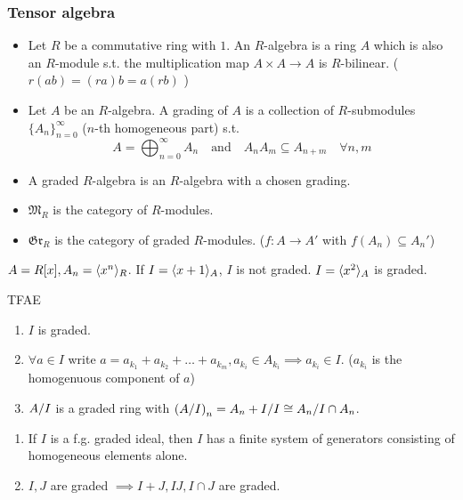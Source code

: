 \subsubsection{Tensor algebra}
\begin{definition} \mbox{}
  \begin{itemize}
    \item Let $R$ be a commutative ring with $1$.
      An $R$-algebra is a ring $A$ which is also an $R$-module s.t. the
      multiplication map $A \times A \to A$ is $R$-bilinear.
      ( $r(ab) = (ra)b = a(rb)$ )
    \item Let $A$ be an $R$-algebra. A grading of $A$ is a collection of
      $R$-submodules $\{ A_n \}_{n=0}^\infty$ ($n$-th homogeneous part) s.t.
      \[
        A = \bigoplus_{n=0}^\infty A_n \quad \text{and} \quad
        A_nA_m \subseteq A_{n+m} \quad \forall n,m
      \]
    \item A graded $R$-algebra is an $R$-algebra with a chosen grading.
    \item $\mathfrak{M}_R$ is the category of $R$-modules.
    \item $\mathfrak{Gr}_R$ is the category of graded $R$-modules.
      ($f: A \to A'$ with $f(A_n) \subseteq A_n'$)
  \end{itemize}
\end{definition}

\begin{example}
  $A = R[x], A_n = \langle x^n\rangle_R$. If $I = \langle x+1\rangle_A$, $I$ is not graded.
  $I = \langle x^2\rangle_A$ is graded.
\end{example}

\begin{exercise}
  TFAE
  \begin{enumerate}[(1)]
    \item $I$ is graded.
    \item $\forall a \in I$ write $a = a_{k_1} + a_{k_2} + \dots + a_{k_m},
      a_{k_i} \in A_{k_i} \implies a_{k_i} \in I$.
      ($a_{k_i}$ is the homogenuous component of $a$)
    \item ${A}/{I}$ is a graded ring with
      $\left({A}/{I}\right)_n = {A_n + I}/{I}
      \cong {A_n}/{I \cap A_n}$.
  \end{enumerate}
\end{exercise}

\begin{exercise} \mbox{}
  \begin{enumerate}[(1)]
    \item If $I$ is a f.g. graded ideal, then $I$ has a finite system of
      generators consisting of homogeneous elements alone.
    \item $I, J$ are graded $\implies I+J, IJ, I \cap J$ are graded.
  \end{enumerate}
\end{exercise}

